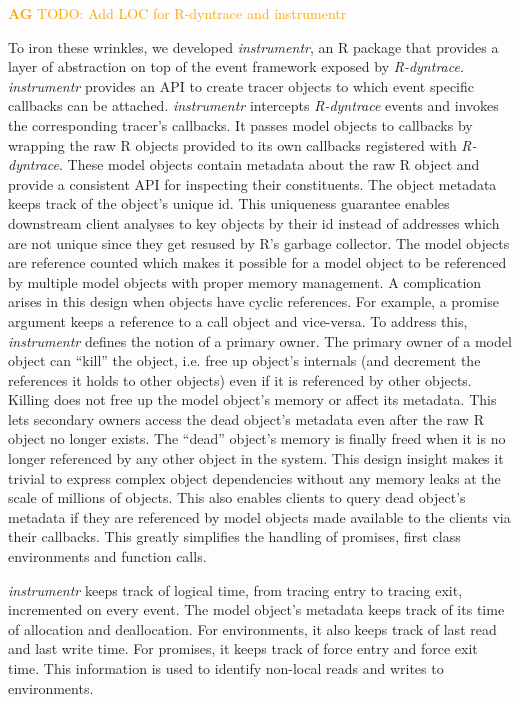 \documentclass[review,nonacm,screen,acmsmall,anonymous=true]{acmart}
\newcommand{\authorcomment}[3]{\xspace\textcolor{#1}{{\bf #2} #3}\xspace} %
\newcommand{\AG}[1]{\authorcomment{orange}{AG}{#1}}
\begin{document}
\AG{TODO: Add LOC for R-dyntrace and instrumentr}

To iron these wrinkles, we developed \emph{instrumentr}, an R package that
provides a layer of abstraction on top of the event framework exposed by
\emph{R-dyntrace}. \emph{instrumentr} provides an API to create tracer objects
to which event specific callbacks can be attached. \emph{instrumentr} intercepts
\emph{R-dyntrace} events and invokes the corresponding tracer's callbacks. It
passes model objects to callbacks by wrapping the raw R objects provided to its
own callbacks registered with \emph{R-dyntrace}. These model objects contain
metadata about the raw R object and provide a consistent API for inspecting
their constituents. The object metadata keeps track of the object's unique id.
This uniqueness guarantee enables downstream client analyses to key objects by
their id instead of addresses which are not unique since they get resused by R's
garbage collector. The model objects are reference counted which makes it
possible for a model object to be referenced by multiple model objects with
proper memory management. A complication arises in this design when objects have
cyclic references. For example, a promise argument keeps a reference to a call
object and vice-versa. To address this, \emph{instrumentr} defines the notion of
a primary owner. The primary owner of a model object can ``kill'' the object,
i.e. free up object's internals (and decrement the references it holds to other
objects) even if it is referenced by other objects. Killing does not free up the
model object's memory or affect its metadata. This lets secondary owners access
the dead object's metadata even after the raw R object no longer exists. The
``dead'' object's memory is finally freed when it is no longer referenced by any
other object in the system. This design insight makes it trivial to express
complex object dependencies without any memory leaks at the scale of millions of
objects. This also enables clients to query dead object's metadata if they are
referenced by model objects made available to the clients via their callbacks.
This greatly simplifies the handling of promises, first class environments and
function calls.

\emph{instrumentr} keeps track of logical time, from tracing
entry to tracing exit, incremented on every event. The model object's metadata
keeps track of its time of allocation and deallocation. For environments, it
also keeps track of last read and last write time. For promises, it keeps track
of force entry and force exit time. This information is used to identify
non-local reads and writes to environments.
\end{document}
